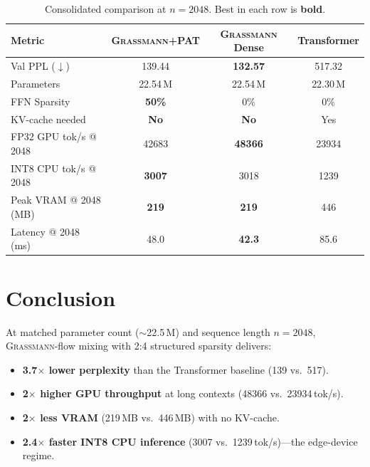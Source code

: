 \documentclass[conference]{IEEEtran}
\newcommand{\grassmann}{\textsc{Grassmann}}
\newcommand{\pat}{\textsc{PAT}}
\begin{document}
\begin{table}[H]
\centering
\caption{Consolidated comparison at $n = 2048$. Best in each row is \textbf{bold}.}
\label{tab:summary}
\footnotesize
\begin{tabular}{@{}l ccc@{}}
\toprule
\textbf{Metric}
  & \textbf{\grassmann{}+\pat{}}
  & \textbf{\grassmann{} Dense}
  & \textbf{Transformer} \\
\midrule
Val PPL ($\downarrow$)
  & 139.44 & \textbf{132.57} & 517.32 \\
Parameters
  & 22.54\,M & 22.54\,M & 22.30\,M \\
FFN Sparsity
  & \textbf{50\%} & 0\% & 0\% \\
KV-cache needed
  & \textbf{No} & \textbf{No} & Yes \\
FP32 GPU tok/s @ 2048
  & \num{42683} & \textbf{\num{48366}} & \num{23934} \\
INT8 CPU tok/s @ 2048
  & \textbf{\num{3007}} & \num{3018} & \num{1239} \\
Peak VRAM @ 2048 (MB)
  & \textbf{219} & \textbf{219} & 446 \\
Latency @ 2048 (ms)
  & 48.0 & \textbf{42.3} & 85.6 \\
\bottomrule
\end{tabular}
\end{table}



\section{Conclusion}
\label{sec:conclusion}

At matched parameter count ($\sim$22.5\,M) and sequence length
$n = 2048$, \grassmann{}-flow mixing with 2:4 structured sparsity
delivers:

\begin{itemize}[leftmargin=*,topsep=3pt,itemsep=2pt]
  \item \textbf{3.7$\times$ lower perplexity} than the Transformer
        baseline (139 vs.\ 517).
  \item \textbf{2$\times$ higher GPU throughput} at long contexts
        (\num{48366} vs.\ \num{23934}\,tok/s).
  \item \textbf{2$\times$ less VRAM} (219\,MB vs.\ 446\,MB) with
        no KV-cache.
  \item \textbf{2.4$\times$ faster INT8 CPU inference} (\num{3007}
        vs.\ \num{1239}\,tok/s)—the edge-device regime.
\end{itemize}
\end{document}
